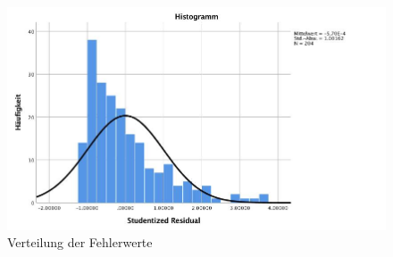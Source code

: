 \begin{figure}[h]
  \centering
     \includegraphics[scale=0.4]{content/Grafik/Histogramm_Hypo2_Residuen.jpg}
  \caption{Verteilung der Fehlerwerte}
  \label{fig:AppHistogrammResiduen}
\end{figure}